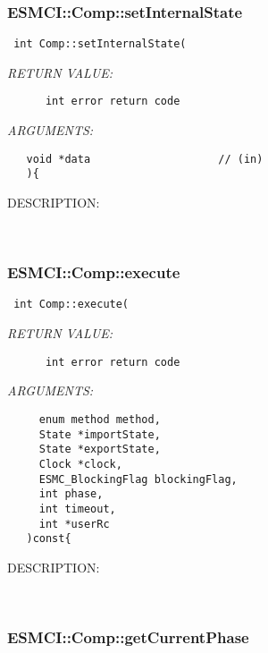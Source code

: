 \subsubsection [ESMCI::Comp::setInternalState] {ESMCI::Comp::setInternalState}


  
\begin{verbatim} int Comp::setInternalState(\end{verbatim}{\em RETURN VALUE:}
\begin{verbatim}      int error return code\end{verbatim}{\em ARGUMENTS:}
\begin{verbatim}   void *data                    // (in)
   ){\end{verbatim}
{\sf DESCRIPTION:\\ }


   
 
\mbox{}\hrulefill\
 
\subsubsection [ESMCI::Comp::execute] {ESMCI::Comp::execute}


  
\begin{verbatim} int Comp::execute(\end{verbatim}{\em RETURN VALUE:}
\begin{verbatim}      int error return code\end{verbatim}{\em ARGUMENTS:}
\begin{verbatim}     enum method method,
     State *importState,
     State *exportState,
     Clock *clock,
     ESMC_BlockingFlag blockingFlag,
     int phase,
     int timeout,
     int *userRc
   )const{\end{verbatim}
{\sf DESCRIPTION:\\ }


   
 
\mbox{}\hrulefill\
 
\subsubsection [ESMCI::Comp::getCurrentPhase] {ESMCI::Comp::getCurrentPhase}


